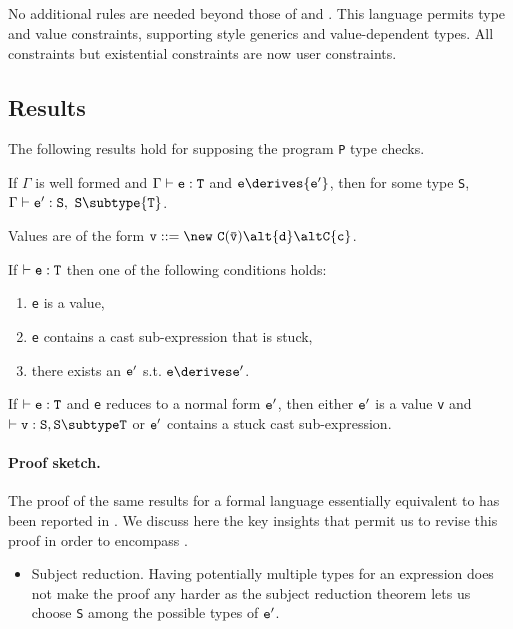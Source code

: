 {\subsection{\FXGD} 

No additional rules are needed beyond those of \FXG{} and \FXD{}. This
language permits type and value constraints, supporting \FGJ{} style
generics and value-dependent types. All constraints but existential constraints are now user constraints.

\subsection{Results}
The following results hold for \FXGD supposing the program {\tt P} type checks.

\begin{theorem} If $\Gamma$ is well formed and $\Gamma \vdash {\tt e:T}$ and ${\tt e} \derives {\tt e'}$, then
for some type {\tt S}, $\Gamma \vdash {\tt {\tt e}':{\tt S}},~{\tt S} \subtype {\tt T}$.
\end{theorem}

Values are of the form $\tt v ::= \new\ C(\bar{\tt v}) \alt {\tt d} \alt C\{c\}$.

\begin{theorem}[Progress]
If $\vdash {\tt e:T}$ then one of the following conditions holds:
\begin{enumerate}
\item {\tt e} is a value,
\item {\tt e} contains a cast sub-expression that is stuck,
\item there exists an $\tt e'$ s.t. $\tt e\derives e'$.
\end{enumerate}
\end{theorem}

\begin{theorem}
If $\vdash {\tt e:T}$ and {\tt e}
reduces to a normal form ${\tt e'}$, then
either $\tt e'$ is a value {\tt v} and $\vdash {\tt v:S},{\tt S\subtype T}$ or
${\tt e'}$ contains  a stuck cast sub-expression.
\end{theorem}

\paragraph{Proof sketch.} The proof of the same results for a
formal language essentially equivalent to \FXD{} has been
reported in \cite{constrained-types}. We discuss here the key
insights that permit us to revise this proof in order to encompass \FXGD{}.
\begin{itemize}
\item Subject reduction. Having potentially multiple types for
an expression does not make the proof any harder as the subject
reduction theorem lets us choose {\tt S} among the possible types of ${\tt e}'$.


\end{itemize}}
